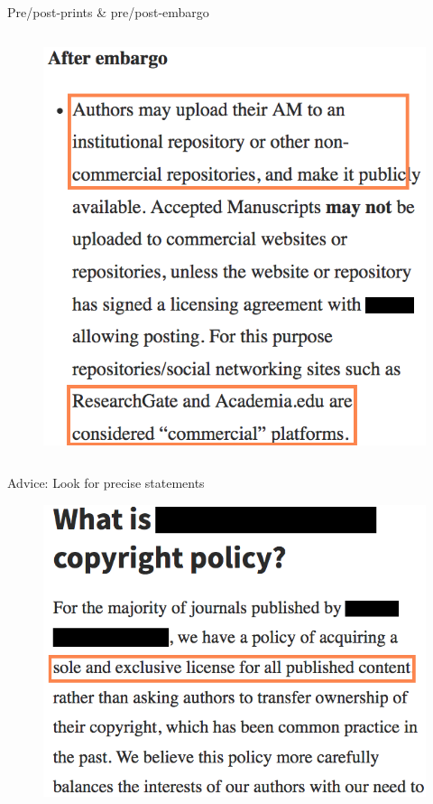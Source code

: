 \documentclass[10pt]{beamer}
\begin{document}
\begin{frame}{Pre/post-prints \& pre/post-embargo}
\begin{columns}
\begin{column}{0.45\linewidth}
\begin{figure}
			\includegraphics[trim={0pt 0pt 0pt 0pt}, clip, width=\columnwidth]{images/licenceFAQ004b}
		\end{figure}
    \end{column}
\end{columns}
\end{frame}

\begin{frame}{Advice: Look for precise statements}
\hspace{-60pt}
	\begin{figure}
    \centering
		\includegraphics[trim={0pt 0pt 0pt 0pt}, clip, width=\columnwidth]{images/licenceFAQ001}
	\end{figure}
\end{frame}
\end{document}
